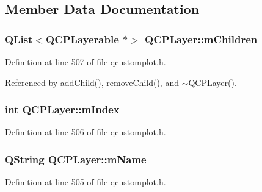 \subsection{Member Data Documentation}
\hypertarget{class_q_c_p_layer_a05045efb8a9694e892b71808bd7433f9}{}
\subsubsection[{m\+Children}]{\setlength{\rightskip}{0pt plus 5cm}Q\+List$<${\bf Q\+C\+P\+Layerable} $\ast$$>$ Q\+C\+P\+Layer\+::m\+Children\hspace{0.3cm}{\ttfamily [protected]}}\label{class_q_c_p_layer_a05045efb8a9694e892b71808bd7433f9}


Definition at line 507 of file qcustomplot.\+h.



Referenced by add\+Child(), remove\+Child(), and $\sim$\+Q\+C\+P\+Layer().

\hypertarget{class_q_c_p_layer_a122088bcab6cec76a52b75ce8606605b}{}
\subsubsection[{m\+Index}]{\setlength{\rightskip}{0pt plus 5cm}int Q\+C\+P\+Layer\+::m\+Index\hspace{0.3cm}{\ttfamily [protected]}}\label{class_q_c_p_layer_a122088bcab6cec76a52b75ce8606605b}


Definition at line 506 of file qcustomplot.\+h.

\hypertarget{class_q_c_p_layer_a91e6298183cb4b9dfd4efdfaf1ecc220}{}
\subsubsection[{m\+Name}]{\setlength{\rightskip}{0pt plus 5cm}Q\+String Q\+C\+P\+Layer\+::m\+Name\hspace{0.3cm}{\ttfamily [protected]}}\label{class_q_c_p_layer_a91e6298183cb4b9dfd4efdfaf1ecc220}


Definition at line 505 of file qcustomplot.\+h.

\hypertarget{class_q_c_p_layer_a2f3374a7884bf403720cd1cf6f7ad1bb}{}
